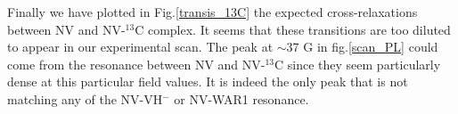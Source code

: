 \documentclass[9pt,twocolumn,twoside]{revtex4-1}
\begin{document}
Finally we have plotted in Fig.\ref{transis_13C} the expected cross-relaxations between NV and NV-$^{13}$C complex. It seems that these transitions are too diluted to appear in our experimental scan. The peak at $\sim$37 G in fig.\ref{scan_PL} could come from the resonance between NV and NV-$^{13}$C since they seem particularly dense at this particular field values.
It is indeed  the only peak that is not matching any of the NV-VH$^-$ or NV-WAR1 resonance.



\end{document}
